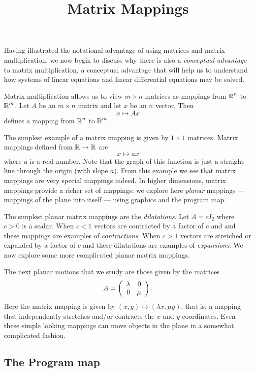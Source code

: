 \documentclass{ximera}
\title{Matrix Mappings}
\begin{document}
\begin{abstract}
\end{abstract}
\maketitle

   \label{s:4.2}

Having illustrated the notational advantage of using matrices
and matrix multiplication, we now begin to discuss why there
is also a {\em conceptual advantage\/} to matrix
multiplication, a conceptual advantage that will help
us to understand how systems of linear equations and linear
differential equations may be solved.

Matrix multiplication allows us to view $m\times n$ matrices as
mappings from $\mbox{$\Bbb{R}$}^n$ to $\mbox{$\Bbb{R}$}^m$.  Let $A$ be an $m\times n$
matrix and let $x$ be an $n$ vector.  Then
\[
x \mapsto Ax
\]
defines a mapping from $\mbox{$\Bbb{R}$}^n$ to $\mbox{$\Bbb{R}$}^m$.

The simplest example of a matrix mapping is given by $1\times 1$
matrices.  Matrix mappings defined from $\mbox{$\Bbb{R}$}\to\mbox{$\Bbb{R}$}$ are
\[
x \mapsto ax
\]
where $a$ is a real number.  Note that the graph of this
function is just a straight line through the origin (with slope
$a$).  From this example we see that matrix mappings are very
special mappings indeed. In higher dimensions, matrix mappings
provide a richer set of mappings; we explore here {\em planar\/}
mappings --- mappings of the plane into
itself --- using \Matlab graphics and the program {\sf map}.

The simplest planar matrix mappings are the
{\em dilatations\/}.
Let $A=cI_2$ where $c>0$ is a scalar.  When $c<1$ vectors are
contracted by a factor of $c$ and and these mappings are
examples of {\em contractions}.
When $c>1$ vectors are
stretched or expanded by a factor of $c$ and these dilatations
are examples of {\em expansions}.
We now explore some more complicated planar matrix mappings.

The next planar motions that we study are those given by the
matrices
\[
A=\left(\begin{array}{rr} \lambda & 0\\ 0 &\mu\end{array}\right).
\]
Here the matrix mapping is given by $(x,y)\mapsto(\lambda x,\mu y)$;
that is, a mapping that independently stretches and/or contracts the
$x$ and $y$ coordinates.  Even these simple looking mappings can move 
objects in the plane in a somewhat complicated fashion.

\subsection*{The Program {\sf map}}  
\end{document}
